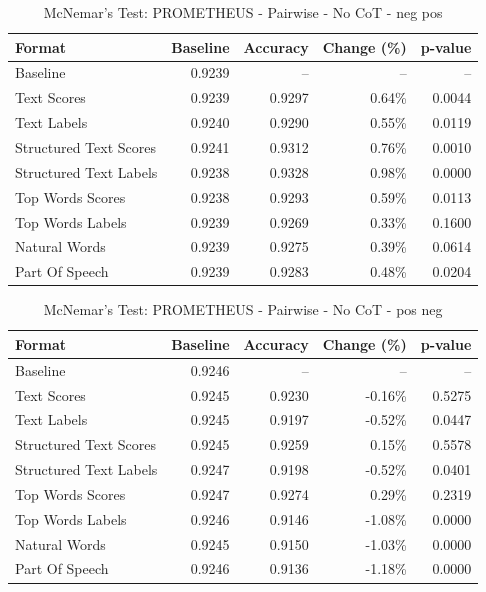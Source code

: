 \begin{table}[htbp]
\centering
\caption{McNemar's Test: PROMETHEUS - Pairwise - No CoT - neg pos}
\label{tab:prometheus-pairwise-no_chain_of_thought-neg_pos}
\begin{tabular}{lrrrr}
\toprule
Format & Baseline & Accuracy & Change (\%) & p-value \\
\midrule
Baseline & 0.9239 & -- & -- & -- \\
Text Scores & 0.9239 & 0.9297 & 0.64\% & 0.0044 \\
Text Labels & 0.9240 & 0.9290 & 0.55\% & 0.0119 \\
Structured Text Scores & 0.9241 & 0.9312 & 0.76\% & 0.0010 \\
Structured Text Labels & 0.9238 & 0.9328 & 0.98\% & 0.0000 \\
Top Words Scores & 0.9238 & 0.9293 & 0.59\% & 0.0113 \\
Top Words Labels & 0.9239 & 0.9269 & 0.33\% & 0.1600 \\
Natural Words & 0.9239 & 0.9275 & 0.39\% & 0.0614 \\
Part Of Speech & 0.9239 & 0.9283 & 0.48\% & 0.0204 \\
\bottomrule
\end{tabular}
\end{table}

\begin{table}[htbp]
\centering
\caption{McNemar's Test: PROMETHEUS - Pairwise - No CoT - pos neg}
\label{tab:prometheus-pairwise-no_chain_of_thought-pos_neg}
\begin{tabular}{lrrrr}
\toprule
Format & Baseline & Accuracy & Change (\%) & p-value \\
\midrule
Baseline & 0.9246 & -- & -- & -- \\
Text Scores & 0.9245 & 0.9230 & -0.16\% & 0.5275 \\
Text Labels & 0.9245 & 0.9197 & -0.52\% & 0.0447 \\
Structured Text Scores & 0.9245 & 0.9259 & 0.15\% & 0.5578 \\
Structured Text Labels & 0.9247 & 0.9198 & -0.52\% & 0.0401 \\
Top Words Scores & 0.9247 & 0.9274 & 0.29\% & 0.2319 \\
Top Words Labels & 0.9246 & 0.9146 & -1.08\% & 0.0000 \\
Natural Words & 0.9245 & 0.9150 & -1.03\% & 0.0000 \\
Part Of Speech & 0.9246 & 0.9136 & -1.18\% & 0.0000 \\
\bottomrule
\end{tabular}
\end{table}